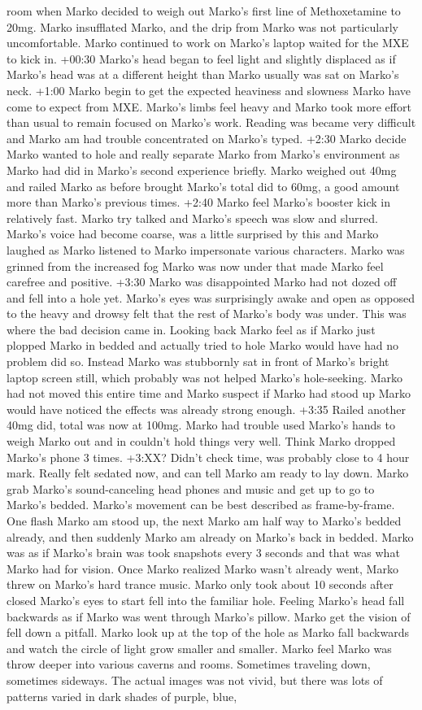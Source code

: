 \documentclass[12pt]{book}
\begin{document}
room when Marko decided to weigh out Marko's first line of Methoxetamine to 20mg. Marko insufflated Marko, and the drip from Marko was not particularly uncomfortable. Marko continued to work on Marko's laptop waited for the MXE to kick in. +00:30 Marko's head began to feel light and slightly displaced as if Marko's head was at a different height than Marko usually was sat on Marko's neck. +1:00 Marko begin to get the expected heaviness and slowness Marko have come to expect from MXE. Marko's limbs feel heavy and Marko took more effort than usual to remain focused on Marko's work. Reading was became very difficult and Marko am had trouble concentrated on Marko's typed. +2:30 Marko decide Marko wanted to hole and really separate Marko from Marko's environment as Marko had did in Marko's second experience briefly. Marko weighed out 40mg and railed Marko as before brought Marko's total did to 60mg, a good amount more than Marko's previous times. +2:40 Marko feel Marko's booster kick in relatively fast. Marko try talked and Marko's speech was slow and slurred. Marko's voice had become coarse, was a little surprised by this and Marko laughed as Marko listened to Marko impersonate various characters. Marko was grinned from the increased fog Marko was now under that made Marko feel carefree and positive. +3:30 Marko was disappointed Marko had not dozed off and fell into a hole yet. Marko's eyes was surprisingly awake and open as opposed to the heavy and drowsy felt that the rest of Marko's body was under. This was where the bad decision came in. Looking back Marko feel as if Marko just plopped Marko in bedded and actually tried to hole Marko would have had no problem did so. Instead Marko was stubbornly sat in front of Marko's bright laptop screen still, which probably was not helped Marko's hole-seeking. Marko had not moved this entire time and Marko suspect if Marko had stood up Marko would have noticed the effects was already strong enough. +3:35 Railed another 40mg did, total was now at 100mg. Marko had trouble used Marko's hands to weigh Marko out and in couldn't hold things very well. Think Marko dropped Marko's phone 3 times. +3:XX? Didn't check time, was probably close to 4 hour mark. Really felt sedated now, and can tell Marko am ready to lay down. Marko grab Marko's sound-canceling head phones and music and get up to go to Marko's bedded. Marko's movement can be best described as frame-by-frame. One flash Marko am stood up, the next Marko am half way to Marko's bedded already, and then suddenly Marko am already on Marko's back in bedded. Marko was as if Marko's brain was took snapshots every 3 seconds and that was what Marko had for vision. Once Marko realized Marko wasn't already went, Marko threw on Marko's hard trance music. Marko only took about 10 seconds after closed Marko's eyes to start fell into the familiar hole. Feeling Marko's head fall backwards as if Marko was went through Marko's pillow. Marko get the vision of fell down a pitfall. Marko look up at the top of the hole as Marko fall backwards and watch the circle of light grow smaller and smaller. Marko feel Marko was throw deeper into various caverns and rooms. Sometimes traveling down, sometimes sideways. The actual images was not vivid, but there was lots of patterns varied in dark shades of purple, blue, 
\end{document}

